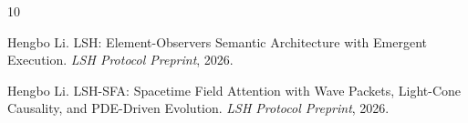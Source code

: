 \documentclass{article}
\begin{document}

\begin{thebibliography}{10}

Hengbo Li.
\newblock LSH: Element-Observers Semantic Architecture with Emergent Execution.
\newblock \emph{LSH Protocol Preprint}, 2026.

Hengbo Li.
\newblock LSH-SFA: Spacetime Field Attention with Wave Packets, Light-Cone Causality, and PDE-Driven Evolution.
\newblock \emph{LSH Protocol Preprint}, 2026.

\end{thebibliography}
\end{document}
